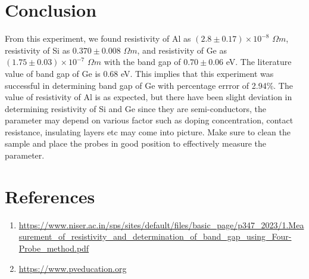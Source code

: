 \documentclass[a4paper, amsfonts, amssymb, amsmath, reprint, showkeys, nofootinbib, twoside]{revtex4-1}
\begin{document}
\section{Conclusion}
From this experiment, we found resistivity of Al as $(2.8\pm0.17)\times10^{-8}$ $\Omega m$, resistivity of Si as $0.370\pm0.008$ $\Omega m$, and resistivity of Ge as $(1.75\pm0.03)\times10^{-7}$ $\Omega m$ with the band gap of $0.70\pm0.06$ eV. The literature value of band gap of Ge is 0.68 eV. This implies that this experiment was successful in determining band gap of Ge with percentage errror of 2.94\%. The value of resistivity of Al is as expected, but there have been slight deviation in determining resistivity of Si and Ge since they are semi-conductors, the parameter may depend on various factor such as doping concentration, contact resistance, insulating layers etc may come into picture. Make sure to clean the sample and place the probes in good position to effectively measure the parameter.

\section{References}
\begin{enumerate}
\item{\url{https://www.niser.ac.in/sps/sites/default/files/basic_page/p347_2023/1.Measurement_of_resistivity_and_determination_of_band_gap_using_Four-Probe_method.pdf}}
\item{\url{https://www.pveducation.org}}


\end{enumerate}
\end{document}
